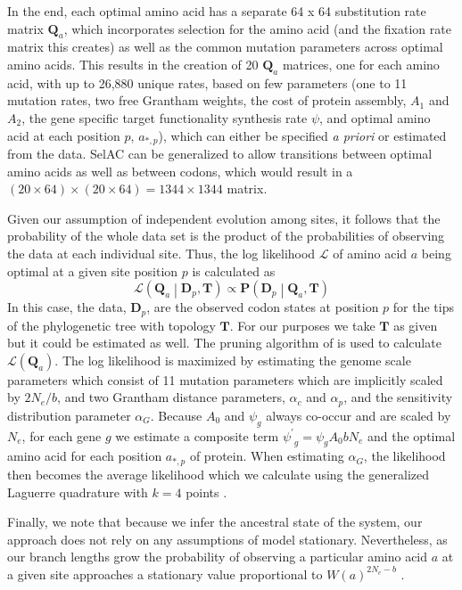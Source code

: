 \documentclass[12pt,letterpaper]{article}
\newcommand{\Ne}{\ensuremath{{N_e}}\xspace} %
\newcommand{\Lik}{\ensuremath{\mathcal{L}}\xspace}%
\newcommand{\Pmatrix}{\ensuremath{\mathbf{P}}\xspace}
\newcommand{\Tmatrix}{\ensuremath{\mathbf{T}}\xspace}
\newcommand{\Dmatrixp}{\ensuremath{\mathbf{D}_p}\xspace}
\newcommand{\Qmatrix}{\ensuremath{\mathbf{Q}}\xspace}
\newcommand{\Qmatrixa}{\ensuremath{\Qmatrix_a}\xspace}
\newcommand{\selac}{SelAC\xspace}
\newcommand{\alphac}{\ensuremath{\alpha_c}\xspace}
\newcommand{\alphag}{\ensuremath{\alpha_G}\xspace}
\newcommand{\alphap}{\ensuremath{\alpha_p}\xspace}
\newcommand{\aoptp}{\ensuremath{a_{*,p}}\xspace}
\newcommand{\psiprime}{\ensuremath{\psi^\prime}\xspace}
\begin{document}
In the end, each optimal amino acid has a separate 64 x 64 substitution rate matrix \Qmatrixa, which incorporates selection for the amino acid (and the fixation rate matrix this creates) as well as the common mutation parameters across optimal amino acids.
This results in the creation of 20 \Qmatrixa matrices, one for each amino acid, with up to 26,880 unique rates, based on few parameters (one to 11 mutation rates, two free Grantham weights, the cost of protein assembly, $A_1$ and $A_2$, the gene specific target functionality synthesis rate $\psi$, and optimal amino acid at each position $p$, \aoptp), which can either be specified \emph{a priori} or  estimated from the data.
\selac can be generalized to allow transitions between optimal amino acids as well as between codons, which would result in a $(20 \times 64) \times (20 \times 64) =  1344 \times 1344$ matrix.

Given our assumption of independent evolution among sites, it follows that the probability of the whole data set is the product of the probabilities of observing the data at each individual site.
Thus, the log likelihood $\Lik$ of amino acid $a$ being optimal at a given site position $p$ is calculated as
\begin{equation}
\Lik\left(\Qmatrixa\middle| \Dmatrixp, \Tmatrix\right) \propto \Pmatrix\left(\Dmatrixp\middle|\Qmatrixa,\Tmatrix\right)
\end{equation}
In this case, the data, $\Dmatrixp$, are the observed codon states at position $p$ for the tips of the phylogenetic tree with topology $\Tmatrix$.
For our purposes we take \Tmatrix as given but it could be estimated as well.
The pruning algorithm of \citet{Felsenstein1981} is used to calculate $\Lik(\Qmatrixa)$.
The log likelihood is maximized by estimating the genome scale parameters which consist of 11 mutation parameters which are implicitly scaled by $2 \Ne/b$, and two Grantham distance parameters, $\alphac$ and $\alphap$, and the sensitivity distribution parameter \alphag.
Because $A_0$ and $\psi_g$ always co-occur and are scaled by \Ne, for each gene $g$ we estimate a composite term $\psiprime_g = \psi_g A_0 b \Ne$ and the optimal amino acid for each position \aoptp of protein.
When estimating \alphag, the likelihood then becomes the average likelihood which we calculate using the generalized Laguerre quadrature with $k = 4$ points \citep{Felsenstein2001}.

Finally, we note that because we infer the ancestral state of the system, our approach does not rely on any assumptions of model stationary.
Nevertheless, as our branch lengths grow the probability of observing a particular amino acid $a$ at a given site approaches a stationary value proportional to $W(a)^{2 \Ne -b}$ \citep{SellaAndHirsh2005}.
\end{document}

